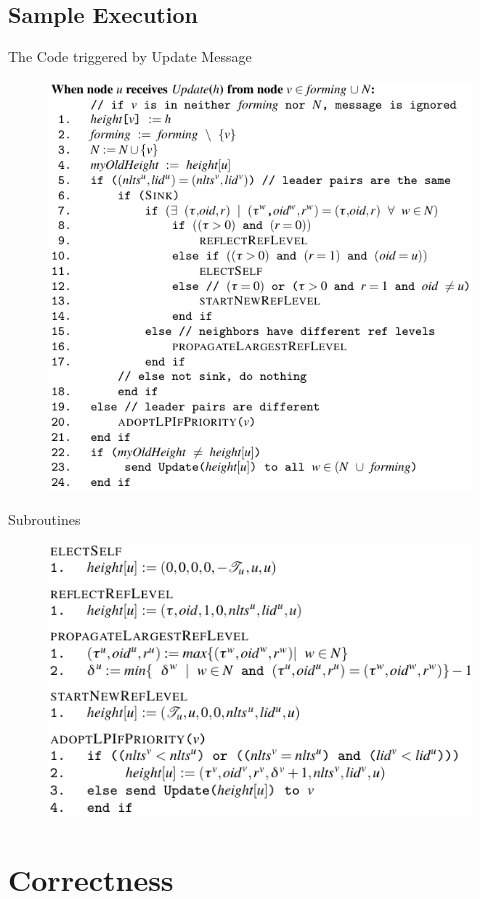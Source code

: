 \documentclass{beamer}
\begin{document}
\subsection{Sample Execution}

\begin{frame}{The Code triggered by Update Message}
\begin{figure}[h]
	\centering
	\includegraphics[width=0.6\linewidth]{tcode_update.png}
	\label{fig:figure1}
\end{figure}
\end{frame}

\begin{frame}{Subroutines}
\begin{figure}[h]
	\centering
	\includegraphics[width=0.8\linewidth]{subroutines.png}
	\label{fig:figure1}
\end{figure}
\end{frame}


\section{Correctness}
\end{document}
